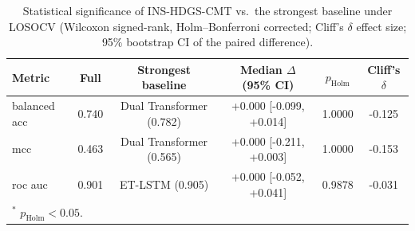 \begin{table}[t]
\centering
\caption{Statistical significance of INS-HDGS-CMT vs.\ the strongest baseline under LOSOCV (Wilcoxon signed-rank, Holm--Bonferroni corrected; Cliff's $\delta$ effect size; 95\% bootstrap CI of the paired difference).}
\label{tab:significance}
\begin{tabular}{l c c c c c}
\hline
Metric & Full & Strongest baseline & Median $\Delta$ (95\% CI) & $p_{\mathrm{Holm}}$ & Cliff's $\delta$ \\
\hline
balanced acc & 0.740 & Dual Transformer (0.782) & +0.000 [-0.099, +0.014] & 1.0000 & -0.125 \\
mcc & 0.463 & Dual Transformer (0.565) & +0.000 [-0.211, +0.003] & 1.0000 & -0.153 \\
roc auc & 0.901 & ET-LSTM (0.905) & +0.000 [-0.052, +0.041] & 0.9878 & -0.031 \\
\hline
\multicolumn{6}{l}{\footnotesize $^{*}$ $p_{\mathrm{Holm}}<0.05$.} \\
\end{tabular}
\end{table}
